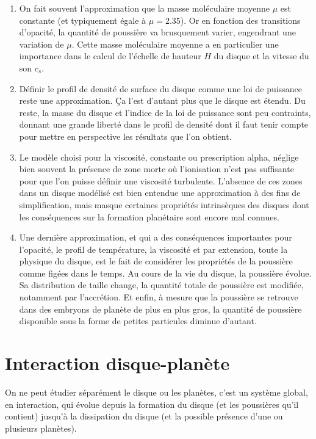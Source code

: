 \begin{enumerate}
\item On fait souvent l'approximation que la masse moléculaire moyenne $\mu$ est constante (et typiquement égale à $\mu=2.35$). Or en fonction des transitions d'opacité, la quantité de poussière va brusquement varier, engendrant une variation de $\mu$. Cette masse moléculaire moyenne a en particulier une importance dans le calcul de l'échelle de hauteur $H$ du disque et la vitesse du son $c_s$. 
\item Définir le profil de densité de surface du disque comme une loi de puissance reste une approximation. Ça l'est d'autant plus que le disque est étendu. Du reste, la masse du disque et l'indice de la loi de puissance sont peu contraints, donnant une grande liberté dans le profil de densité dont il faut tenir compte pour mettre en perspective les résultats que l'on obtient.
\item Le modèle choisi pour la viscosité, constante ou prescription alpha, néglige bien souvent la présence de zone morte où
l'ionisation n'est pas suffisante pour que l'on puisse définir une viscosité turbulente. L'absence de ces zones dans un disque
modélisé est bien entendue une approximation à des fins de simplification, mais masque certaines propriétés intrinsèques des
disques dont les conséquences sur la formation planétaire sont encore mal connues.
\item Une dernière approximation, et qui a des conséquences importantes pour l'opacité, le profil de température, la viscosité et par extension, toute la physique du disque, est le fait de considérer les propriétés de la poussière comme figées dans le temps. Au cours de la vie du disque, la poussière évolue. Sa distribution de taille change, la quantité totale de poussière est modifiée, notamment par l'accrétion. Et enfin, à mesure que la poussière se retrouve dans des embryons de planète de plus en plus gros, la quantité de poussière disponible sous la forme de petites particules diminue d'autant. 
\end{enumerate}

\section{Interaction disque-planète}
On ne peut étudier séparément le disque ou les planètes, c'est un système global, en interaction, qui évolue depuis la formation du disque (et les poussières qu'il contient) jusqu'à la dissipation du disque (et la possible présence d'une ou plusieurs planètes).

